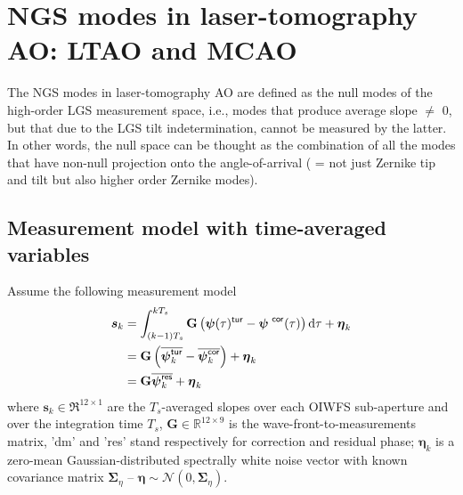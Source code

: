 \documentclass[a4paper,12pt]{article}
\newcommand{\0}{\mathsf{0}} %
\newcommand{\CovMat}{\boldsymbol{\Sigma}} %
\newcommand{\D}{\mathbf{G}} %
\newcommand{\tur}{\mathsf{\tiny{tur}}}
\newcommand{\dint}{\mathrm{d}} %
\newcommand{\res}{\mathsf{\tiny{res}}}
\newcommand{\cor}{\mathsf{\tiny{cor}}}
\begin{document}





\section{NGS modes in laser-tomography AO: LTAO and MCAO}


The NGS modes in laser-tomography AO are defined as the null modes
of the high-order LGS measurement space, i.e., modes that produce
average slope $\neq$ 0, but that due to the LGS tilt indetermination,
cannot be measured by the latter. In other words, the null space can
be thought as the combination of all the modes that have non-null
projection onto the angle-of-arrival ( = not just Zernike tip and tilt
but also higher order Zernike modes).


\subsection{Measurement model with time-averaged variables }\label{sec:measurement-model}

Assume the following measurement model 
\begin{subequations}\label{eq:meas_quadratic_modes}
\begin{align}
\boldsymbol{s}_k & = \int_{(k-1)T_s}^{kT_s} \D\left(  \boldsymbol\psi (\tau)^\tur - 
  \boldsymbol\psi^{\,\,\cor} (\tau) \right) \dint \tau + \boldsymbol\eta_k \\
& = \D \left(  \overline{\boldsymbol\psi^\tur _{k}} - 
  \overline{\boldsymbol\psi^\cor_{k}} \right) + \boldsymbol\eta_k \\
& = \D   \overline{\boldsymbol\psi^\res_k} + \boldsymbol\eta_k
\end{align}
\end{subequations}
where  $\boldsymbol{s}_k \in \Re^{12\times1}$ are the $T_s$-averaged
       slopes over each OIWFS sub-aperture and over the integration
       time $T_s$, $\D \in \mathbb{R}^{12\times 9}$ is the wave-front-to-measurements
matrix, 'dm' and 'res' stand respectively for
correction and residual phase;  $\boldsymbol{\eta}_k$ is a zero-mean
Gaussian-distributed spectrally white noise vector with known covariance matrix
$\CovMat_\eta$ --
$\boldsymbol\eta\sim \mathcal{N}(0,\CovMat_\eta)$.
\end{document}
